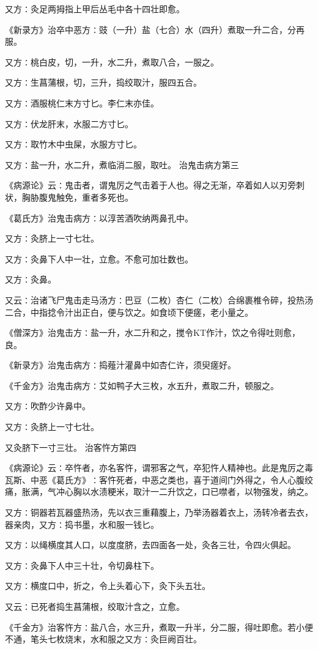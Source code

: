 \documentclass[a4paper,12pt,UTF8,twoside]{ctexbook}
\begin{document}
又方∶灸足两拇指上甲后丛毛中各十四壮即愈。

《新录方》治卒中恶方∶豉（一升）盐（七合）水（四升）煮取一升二合，分再服。

又方∶桃白皮，切，一升，水二升，煮取八合，一服之。

又方∶生菖蒲根，切，三升，捣绞取汁，服四五合。

又方∶酒服桃仁末方寸匕。李仁末亦佳。

又方∶伏龙肝末，水服二方寸匕。

又方∶取竹木中虫屎，水服方寸匕。

又方∶盐一升，水二升，煮临消二服，取吐。
治鬼击病方第三

《病源论》云∶鬼击者，谓鬼厉之气击着于人也。得之无渐，卒着如人以刃旁刺状，胸胁腹鬼触免，重者多死也。

《葛氏方》治鬼击病方∶以淳苦酒吹纳两鼻孔中。

又方∶灸脐上一寸七壮。

又方∶灸鼻下人中一壮，立愈。不愈可加壮数也。

又方∶灸鼻。

又云∶治诸飞尸鬼击走马汤方∶巴豆（二枚）杏仁（二枚）合绵裹椎令碎，投热汤二合，中指捻令汁出正白，便与饮之。如食顷下便瘥，老小量之。

《僧深方》治鬼击方∶盐一升，水二升和之，搅令KT作汁，饮之令得吐则愈，良。

《新录方》治鬼击病方∶捣薤汁灌鼻中如杏仁许，须臾瘥好。

《千金方》治鬼击病方∶艾如鸭子大三枚，水五升，煮取二升，顿服之。

又方∶吹酢少许鼻中。

又方∶灸脐上一寸七壮。

又灸脐下一寸三壮。
治客忤方第四

《病源论》云∶卒忤者，亦名客忤，谓邪客之气，卒犯忤人精神也。此是鬼厉之毒瓦斯、中恶《葛氏方》∶客忤死者，中恶之类也，喜于道间门外得之，令人心腹绞痛，胀满，气冲心胸以水渍粳米，取汁一二升饮之，口已噤者，以物强发，纳之。

又方∶铜器若瓦器盛热汤，先以衣三重藉腹上，乃举汤器着衣上，汤转冷者去衣，器亲肉，又方∶捣书墨，水和服一钱匕。

又方∶以绳横度其人口，以度度脐，去四面各一处，灸各三壮，令四火俱起。

又方∶灸鼻下人中三十壮，令切鼻柱下。

又方∶横度口中，折之，令上头着心下，灸下头五壮。

又云∶已死者捣生菖蒲根，绞取汁含之，立愈。

《千金方》治客忤方∶盐八合，水三升，煮取一升半，分二服，得吐即愈。若小便不通，笔头七枚烧末，水和服之又方∶灸巨阙百壮。
\end{document}
